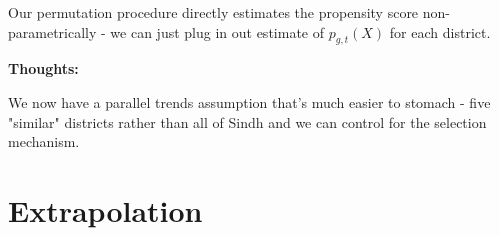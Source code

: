 \documentclass{article}
\begin{document}
Our permutation procedure directly estimates the propensity score non-parametrically -
we can just plug in out estimate of $p_{g,t}(X)$ for each district.

\textbf{Thoughts:}


We now have a parallel trends assumption that's much easier to stomach - 
five "similar" districts rather than all of Sindh and we can control  
for the selection mechanism.


\section{Extrapolation}
\end{document}
